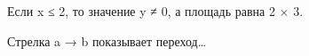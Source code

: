 \begin{definition}
Если x ≤ 2, то значение y ≠ 0, а площадь равна 2 × 3.
\end{definition}
\begin{note}
Стрелка a → b показывает переход…
\end{note}
